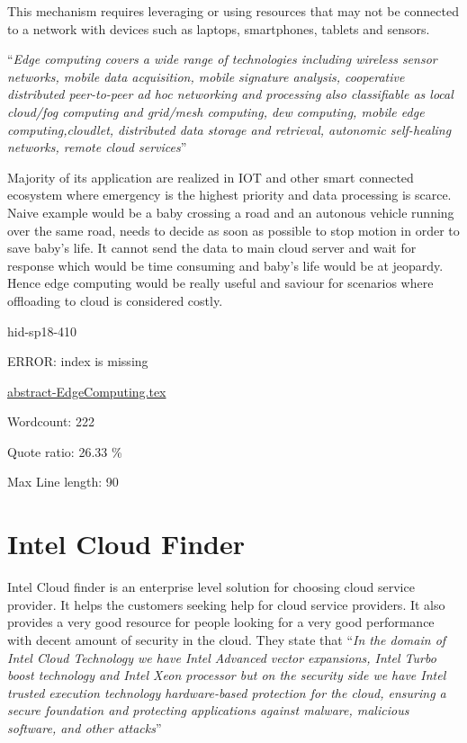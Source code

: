 This mechanism requires leveraging or using resources that may not be 
connected to a network with devices such as laptops, smartphones, 
tablets and sensors.

\color{blue}``\emph{Edge computing covers a wide range of technologies including wireless 
sensor networks, mobile data acquisition, mobile signature analysis, 
cooperative distributed peer-to-peer ad hoc networking and processing 
also classifiable as local cloud/fog computing and grid/mesh computing, 
dew computing, mobile edge computing,cloudlet, distributed data storage
and retrieval, autonomic self-healing networks,
remote cloud services}''\color{black}~\cite{hid-sp18-410-edge}

Majority of its application are realized in IOT and other smart connected
ecosystem where emergency is the highest priority and data processing
is scarce. Naive example would be a baby crossing a road and an autonous
vehicle running over the same road, needs to decide as soon as possible
to stop motion in order to save baby's life. It cannot send the data to
main cloud server and wait for response which would be time consuming and
baby's life would be at jeopardy.
Hence edge computing would be really useful and saviour for scenarios where
offloading to cloud is considered costly.


\begin{IU}

hid-sp18-410

ERROR: index is missing

\href{https://github.com/cloudmesh-community/hid-sp18-410/blob/master//technology/abstract-EdgeComputing.tex}{abstract-EdgeComputing.tex}

 

Wordcount: 222


Quote ratio: 26.33 \%
 
Max Line length: 90
\end{IU}

\section{Intel Cloud Finder}



Intel Cloud finder is an enterprise level solution for choosing cloud
service provider. It helps the customers seeking help for cloud
service providers. It also provides a very good resource for people
looking for a very good performance with decent amount of security in
the cloud. They state that \color{blue}``\emph{In the domain of Intel Cloud Technology
we have Intel Advanced vector expansions, Intel Turbo boost technology
and Intel Xeon processor but on the security side we have Intel
trusted execution technology hardware-based protection for the cloud,
ensuring a secure foundation and protecting applications against
malware, malicious software, and other attacks}''\color{black}~\cite{hid-sp18-410-Intel}

